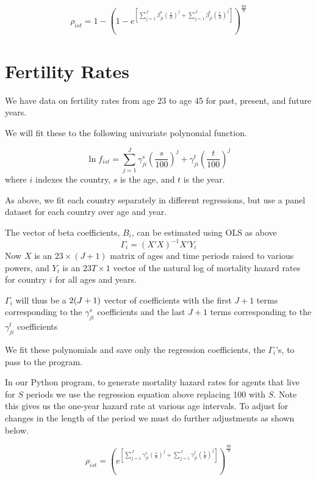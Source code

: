 \documentclass[letterpaper,12pt]{article}
\theoremstyle{definition}
\numberwithin{equation}{section}
\begin{document}
\begin{spacing}{1.5}
	\begin{equation}
		\rho_{ist} = 1 - \left(1-e^{\left[\sum_{j=1}^J \beta^s_{ji} \left(\frac{s}{S}\right)^j+\sum_{j=1}^J \beta^t_{ji} \left(\frac{t}{S}\right)^j\right]}\right)^{\frac{80}{S}}
	\end{equation}

\section{Fertility Rates}
	We have data on fertility rates from age 23 to age 45 for past, present, and future years.

	We will fit these to the following univariate polynomial function.

	\begin{equation}
		\ln f_{ist} = \sum_{j=1}^J \gamma^s_{ji} \left(\frac{s}{100}\right)^j + \gamma^t_{ji} \left(\frac{t}{100}\right)^j
	\end{equation}
	where $i$ indexes the country, $s$ is the age, and $t$ is the year.

	As above, we fit each country separately in different regressions, but use a panel dataset for each country over age and year.

	The vector of beta coefficients, $B_{i}$, can be estimated using OLS as above
	\begin{equation}
		\Gamma_i = (X'X)^{-1}X'Y_i
	\end{equation}
	Now $X$ is an $23 \times(J+1)$ matrix of ages and time periods raised to various powers, and $Y_i$ is an $23T \times 1$ vector of the natural log of mortality hazard rates for country $i$ for all ages and years.

	$\Gamma_i$ will thus be a $2(J+1) \time 1$ vector of coefficients with the first $J+1$ terms corresponding to the $\gamma^s_{ji}$ coefficients and the last $J+1$ terms corresponding to the $\gamma^t_{ji}$ coefficients

	We fit these polynomials and save only the regression coefficients, the $\Gamma_i$'s, to pass to the program.

	In our Python program, to generate mortality hazard rates for agents that live for $S$ periods we use the regression equation above replacing 100 with $S$.  Note this gives us the one-year hazard rate at various age intervals.  To adjust for changes in the length of the period we must do further adjustments as shown below.

	\begin{equation}
		\rho_{ist} = \left(e^{\left[\sum_{j=1}^J \gamma^s_{ji} \left(\frac{s}{S}\right)^j+\sum_{j=1}^J \gamma^t_{ji} \left(\frac{t}{S}\right)^j\right]}\right)^{\frac{80}{S}}
	\end{equation}

\end{spacing}

\newpage

\end{document}
